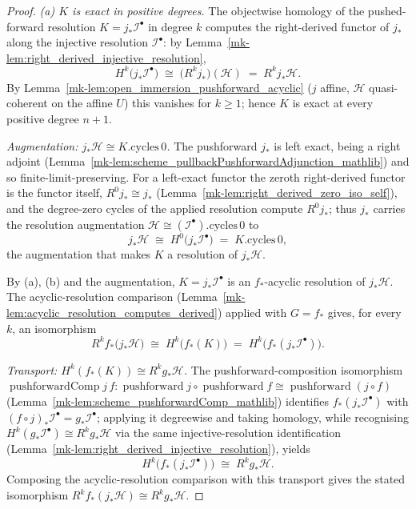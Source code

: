\begin{proof}
  \emph{(a) \(K\) is exact in positive degrees.} The objectwise homology of the pushed-forward
  resolution \(K = j_*\mathcal{I}^\bullet\) in degree \(k\) computes the right-derived functor of
  \(j_*\) along the injective resolution \(\mathcal{I}^\bullet\): by
  Lemma~\ref{mk-lem:right_derived_injective_resolution},
  \[
    H^k\bigl(j_*\mathcal{I}^\bullet\bigr) \;\cong\; \bigl(R^k j_*\bigr)(\mathcal{H})
      \;=\; R^k j_*\mathcal{H}.
  \]
  By Lemma~\ref{mk-lem:open_immersion_pushforward_acyclic} (\(j\) affine, \(\mathcal{H}\) quasi-coherent
  on the affine \(U\)) this vanishes for \(k \geq 1\); hence \(K\) is exact at every positive degree
  \(n+1\).

  \emph{Augmentation: \(j_*\mathcal{H} \cong K.\mathrm{cycles}\,0\).} The pushforward \(j_*\) is left
  exact, being a right adjoint (Lemma~\ref{mk-lem:scheme_pullbackPushforwardAdjunction_mathlib}) and so
  finite-limit-preserving. For a left-exact functor the zeroth right-derived functor is the functor
  itself, \(R^0 j_* \cong j_*\) (Lemma~\ref{mk-lem:right_derived_zero_iso_self}), and the degree-zero
  cycles of the applied resolution compute \(R^0 j_*\); thus \(j_*\) carries the resolution
  augmentation \(\mathcal{H} \cong (\mathcal{I}^\bullet).\mathrm{cycles}\,0\) to
  \[
    j_*\mathcal{H} \;\cong\; H^0\bigl(j_*\mathcal{I}^\bullet\bigr)
      \;=\; K.\mathrm{cycles}\,0,
  \]
  the augmentation that makes \(K\) a resolution of \(j_*\mathcal{H}\).

  By (a), (b) and the augmentation, \(K = j_*\mathcal{I}^\bullet\) is an \(f_*\)-acyclic resolution
  of \(j_*\mathcal{H}\). The acyclic-resolution comparison
  (Lemma~\ref{mk-lem:acyclic_resolution_computes_derived}) applied with \(G = f_*\) gives, for every
  \(k\), an isomorphism
  \[
    R^k f_*\bigl(j_*\mathcal{H}\bigr) \;\cong\; H^k\bigl(f_*(K)\bigr)
      \;=\; H^k\bigl(f_*(j_*\mathcal{I}^\bullet)\bigr).
  \]

  \emph{Transport: \(H^k(f_*(K)) \cong R^k g_*\mathcal{H}\).} The pushforward-composition isomorphism
  \(\operatorname{pushforwardComp} j\,f : \operatorname{pushforward} j \circ \operatorname{pushforward}
  f \cong \operatorname{pushforward}(j \circ f)\) (Lemma~\ref{mk-lem:scheme_pushforwardComp_mathlib})
  identifies \(f_*(j_*\mathcal{I}^\bullet)\) with \((f \circ j)_*\mathcal{I}^\bullet = g_*\mathcal{I}^
  \bullet\); applying it degreewise and taking homology, while recognising \(H^k(g_*\mathcal{I}^
  \bullet) \cong R^k g_*\mathcal{H}\) via the same injective-resolution identification
  (Lemma~\ref{mk-lem:right_derived_injective_resolution}), yields
  \[
    H^k\bigl(f_*(j_*\mathcal{I}^\bullet)\bigr) \;\cong\; R^k g_*\mathcal{H}.
  \]
  Composing the acyclic-resolution comparison with this transport gives the stated isomorphism
  \(R^k f_*(j_*\mathcal{H}) \cong R^k g_*\mathcal{H}\).
\end{proof}

